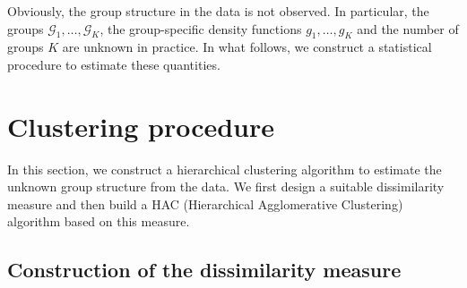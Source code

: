 \documentclass[a4paper,12pt]{article}
\numberwithin{equation}{section}
\begin{document}
Obviously, the group structure in the data is not observed. In particular, the groups $\mathcal{G}_1,\ldots,\mathcal{G}_K$, the group-specific density functions $g_1,\ldots,g_K$ and the number of groups $K$ are unknown in practice. In what follows, we construct a statistical procedure to estimate these quantities. 



\section{Clustering procedure}


In this section, we construct a hierarchical clustering algorithm to estimate the unknown group structure from the data. We first design a suitable dissimilarity measure and then build a HAC (Hierarchical Agglomerative Clustering) algorithm based on this measure.


\subsection{Construction of the dissimilarity measure} 
\end{document}
